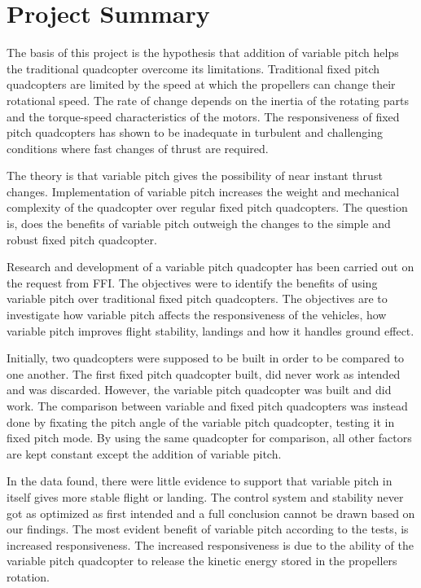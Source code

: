 \chapter{Project Summary}

The basis of this project is the hypothesis that addition of variable pitch helps the traditional quadcopter overcome its limitations. Traditional fixed pitch quadcopters are limited by the speed at which the propellers can change their rotational speed. The rate of change depends on the inertia of the rotating parts and the torque-speed characteristics of the motors. The responsiveness of fixed pitch quadcopters has shown to be inadequate in turbulent and challenging conditions where fast changes of thrust are required. \bigskip

The theory is that variable pitch gives the possibility of near instant thrust changes. Implementation of variable pitch increases the weight and mechanical complexity of the quadcopter over regular fixed pitch quadcopters. The question is, does the benefits of variable pitch outweigh the changes to the simple and robust fixed pitch quadcopter. \bigskip

Research and development of a variable pitch quadcopter has been carried out on the request from FFI. The objectives were to identify the benefits of using variable pitch over traditional fixed pitch quadcopters. The objectives are to investigate how variable pitch affects the responsiveness of the vehicles, how variable pitch improves flight stability, landings and how it handles ground effect. \bigskip

Initially, two quadcopters were supposed to be built in order to be compared to one another. The first fixed pitch quadcopter built, did never work as intended and was discarded. However, the variable pitch quadcopter was built and did work. The comparison between variable and fixed pitch quadcopters was instead done by fixating the pitch angle of the variable pitch quadcopter, testing it in fixed pitch mode. By using the same quadcopter for comparison, all other factors are kept constant except the addition of variable pitch.\bigskip

In the data found, there were little evidence to support that variable pitch in itself gives more stable flight or landing. The control system and stability never got as optimized as first intended and a full conclusion cannot be drawn based on our findings. The most evident benefit of variable pitch according to the tests, is increased responsiveness. The increased responsiveness is due to the ability of the variable pitch quadcopter to release the kinetic energy stored in the propellers rotation.\bigskip

